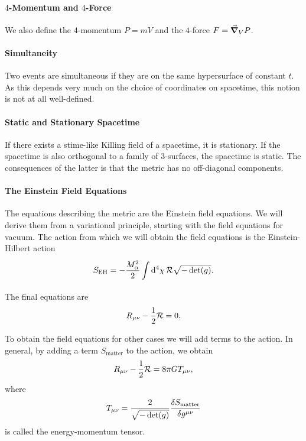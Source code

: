 \paragraph{$4$-Momentum and $4$-Force}
We also define the $4$-momentum $P = mV$ and the $4$-force $F = \grad_{V}{P}$.

\paragraph{Simultaneity}
Two events are simultaneous if they are on the same hypersurface of constant $t$. As this depends very much on the choice of coordinates on spacetime, this notion is not at all well-defined.

\paragraph{Static and Stationary Spacetime}
If there exists a stime-like Killing field of a spacetime, it is stationary. If the spacetime is also orthogonal to a family of $3$-surfaces, the spacetime is static. The consequences of the latter is that the metric has no off-diagonal components.

\paragraph{The Einstein Field Equations}
The equations describing the metric are the Einstein field equations. We will derive them from a variational principle, starting with the field equations for vacuum. The action from which we will obtain the field equations is the Einstein-Hilbert action
\begin{align*}
	S_{\text{EH}} = -\frac{M_{\alpha}^{2}}{2}\int\limits_{}^{}\dd[4]{\chi}\mathcal{R}\sqrt{-\det(g)}.
\end{align*}
The final equations are
\begin{align*}
	R_{\mu\nu} - \frac{1}{2}\mathcal{R} = 0.
\end{align*}

To obtain the field equations for other cases we will add terms to the action. In general, by adding a term $S_{\text{matter}}$ to the action, we obtain
\begin{align*}
	R_{\mu\nu} - \frac{1}{2}\mathcal{R} = 8\pi GT_{\mu\nu},
\end{align*}
where
\begin{align*}
	T_{\mu\nu} = \frac{2}{\sqrt{-\det(g)}}\fdv{S_{\text{matter}}}{g^{\mu\nu}}
\end{align*}
is called the energy-momentum tensor.

